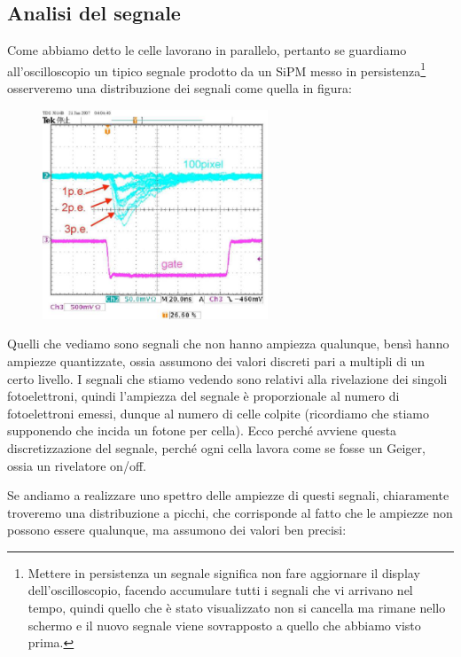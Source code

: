\subsection{Analisi del segnale}
Come abbiamo detto le celle lavorano in parallelo, pertanto se guardiamo all'oscilloscopio un tipico segnale prodotto da un SiPM messo in persistenza\footnote{Mettere in persistenza un segnale significa non fare aggiornare il display dell'oscilloscopio, facendo accumulare tutti i segnali che vi arrivano nel tempo, quindi quello che è stato visualizzato non si cancella ma rimane nello schermo e il nuovo segnale viene sovrapposto a quello che abbiamo visto prima.} osserveremo una distribuzione dei segnali come quella in figura:
\begin{figure}[H]
   \centering
   \includegraphics[width=0.6\textwidth]{immagini/segnale_persistenza_SiPM.png}
\end{figure}
Quelli che vediamo sono segnali che non hanno ampiezza qualunque, bensì hanno ampiezze quantizzate, ossia assumono dei valori discreti pari a multipli di un certo livello. I segnali che stiamo vedendo sono relativi alla rivelazione dei singoli fotoelettroni, quindi l'ampiezza del segnale è proporzionale al numero di fotoelettroni emessi, dunque al numero di celle colpite (ricordiamo che stiamo supponendo che incida un fotone per cella). Ecco perché avviene questa discretizzazione del segnale, perché ogni cella lavora come se fosse un Geiger, ossia un rivelatore on/off.

Se andiamo a realizzare uno spettro delle ampiezze di questi segnali, chiaramente troveremo una distribuzione a picchi, che corrisponde al fatto che le ampiezze non possono essere qualunque, ma assumono dei valori ben precisi:

